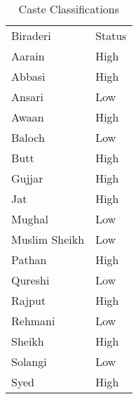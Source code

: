 \begin{table}[hb!]
\centering
\caption{Caste Classifications}
\label{my-label}
\begin{tabular}{ll}
Biraderi      & Status \\
Aarain        & High   \\
Abbasi        & High   \\
Ansari        & Low    \\
Awaan         & High   \\
Baloch        & Low    \\
Butt          & High   \\
Gujjar        & High   \\
Jat           & High   \\
Mughal        & Low    \\
Muslim Sheikh & Low    \\
Pathan        & High   \\
Qureshi       & Low    \\
Rajput        & High   \\
Rehmani       & Low    \\
Sheikh        & High   \\
Solangi       & Low    \\
Syed          & High
\end{tabular}
\end{table}
